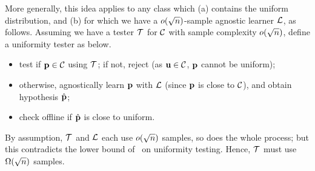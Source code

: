 More generally, this idea applies to any class \class which \textsf{(a)} contains the uniform distribution, and \textsf{(b)} for which we have a $\littleO{\sqrt{n}}$-sample agnostic learner $\mathcal{L}$, as follows.
Assuming we have a tester $\mathcal{T}$ for $\mathcal{C}$ with sample complexity $\littleO{\sqrt{n}}$, define a uniformity tester as below.
\begin{itemize}
  \item test if $\mathbf{p}\in\mathcal{C}$ using $\mathcal{T}$; if not, reject (as $\mathbf{u}\in\mathcal{C}$, $\mathbf{p}$ cannot be uniform);
  \item otherwise, agnostically learn $\mathbf{p}$ with $\mathcal{L}$ (since $\mathbf{p}$ is close to $\mathcal{C}$), and obtain hypothesis $\hat{\mathbf{p}}$;
  \item check offline if $\hat{\mathbf{p}}$ is close to uniform.
\end{itemize} 
By assumption, $\mathcal{T}$ and $\mathcal{L}$ each use $\littleO{\sqrt{n}}$ samples, so does the whole process; but this contradicts the lower bound of~\cite{BFRSW:00,Paninski:08} on uniformity testing. Hence, $\mathcal{T}$ must use $\bigOmega{\sqrt{n}}$ samples.\medskip


